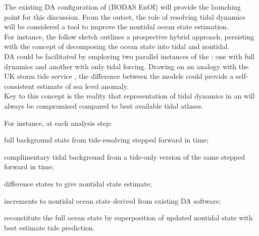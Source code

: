
The existing DA configuration of \BL{} (BODAS EnOI)  will provide the launching point for this discussion.  From the outset, the role of resolving tidal dynamics will be considered a tool to improve the nontidal ocean state estimation. \\




For instance, the follow sketch outlines a prospective hybrid approach, persisting with the concept of decomposing the ocean state into tidal and nontidal.\\
DA could be facilitated by employing two parallel instances of the \OGCM{}: one with full dynamics and another with only tidal forcing.   Drawing on an analogy with the UK storm tide service \cite{Horsburg:2009ui}, the difference between the models could provide a self-consistent estimate of sea level anomaly.\\
Key to this concept is the reality that representation of tidal dynamics in an \OGCM{} will always be compromised compared to best available tidal atlases. 

For instance, at each analysis step:   
\begin{inparaenum}[(i)]
\item full background state from tide-resolving \OGCM{} stepped forward in time;
\item complimentary tidal background from a tide-only version of the same \OGCM{} stepped forward in time;
\item difference states to give nontidal state estimate;
\item increments to nontidal ocean state derived from existing DA software;
\item reconstitute the full ocean state by superposition of updated nontidal state with best estimate tide prediction.
\end{inparaenum}




